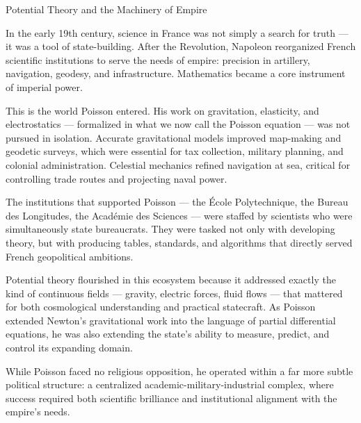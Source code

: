 \begin{HistoricalSidebar}{Potential Theory and the Machinery of Empire}

In the early 19th century, science in France was not simply a search for truth — it was a tool of state-building. 
After the Revolution, Napoleon reorganized French scientific institutions to serve the needs of empire: precision 
in artillery, navigation, geodesy, and infrastructure. Mathematics became a core instrument of imperial power.

\medskip

This is the world Poisson entered. His work on gravitation, elasticity, and electrostatics — formalized in what 
we now call the Poisson equation — was not pursued in isolation. Accurate gravitational models improved map-making 
and geodetic surveys, which were essential for tax collection, military planning, and colonial administration. 
Celestial mechanics refined navigation at sea, critical for controlling trade routes and projecting naval power.

\medskip

The institutions that supported Poisson — the École Polytechnique, the Bureau des Longitudes, the Académie 
des Sciences — were staffed by scientists who were simultaneously state bureaucrats. They were tasked not only 
with developing theory, but with producing tables, standards, and algorithms that directly served French 
geopolitical ambitions.

\medskip

Potential theory flourished in this ecosystem because it addressed exactly the kind of continuous fields — 
gravity, electric forces, fluid flows — that mattered for both cosmological understanding and practical 
statecraft. As Poisson extended Newton’s gravitational work into the language of partial differential equations, 
he was also extending the state’s ability to measure, predict, and control its expanding domain.

\medskip

While Poisson faced no religious opposition, he operated within a far more subtle political structure: a centralized 
academic-military-industrial complex, where success required both scientific brilliance and institutional alignment 
with the empire’s needs.

\begin{figure}[H]
    \centering
    \begin{tikzpicture}[
      node distance=2cm,
      every node/.style={rectangle, draw=black, rounded corners, align=center, minimum width=3.5cm, minimum height=1cm},
      arrow/.style={->, thick}
    ]
    

\end{tikzpicture}
\end{figure}
\end{HistoricalSidebar}
